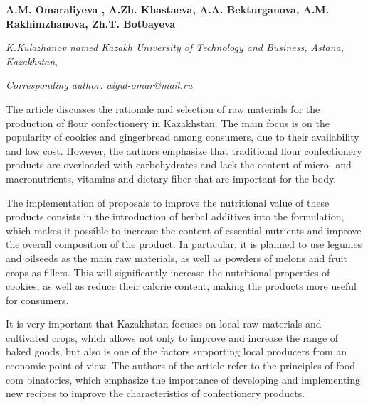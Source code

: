
\begin{articleheader}

{\bfseries
A.M. Omaraliyeva\textsuperscript{\envelope } ,
A.Zh. Khastaeva,
A.A. Bekturganova,
A.M. Rakhimzhanova,
Zh.T. Botbayeva}
\end{articleheader}

\begin{affiliation}
\emph{K.Kulazhanov named Kazakh University of Technology and Business, Astana, Kazakhstan,}

\raggedright \textsuperscript{\envelope }{\em Corresponding author: aigul-omar@mail.ru}
\end{affiliation}

The article discusses the rationale and selection of raw materials for
the production of flour confectionery in Kazakhstan. The main focus is
on the popularity of cookies and gingerbread among consumers, due to
their availability and low cost. However, the authors emphasize that
traditional flour confectionery products are overloaded with
carbohydrates and lack the content of micro- and macronutrients,
vitamins and dietary fiber that are important for the body.

The implementation of proposals to improve the nutritional value of
these products consists in the introduction of herbal additives into the
formulation, which makes it possible to increase the content of
essential nutrients and improve the overall composition of the product.
In particular, it is planned to use legumes and oilseeds as the main raw
materials, as well as powders of melons and fruit crops as fillers. This
will significantly increase the nutritional properties of cookies, as
well as reduce their calorie content, making the products more useful
for consumers.

It is very important that Kazakhstan focuses on local raw materials and
cultivated crops, which allows not only to improve and increase the
range of baked goods, but also is one of the factors supporting local
producers from an economic point of view. The authors of the article
refer to the principles of food com binatorics, which emphasize the
importance of developing and implementing new recipes to improve the
characteristics of confectionery products.

